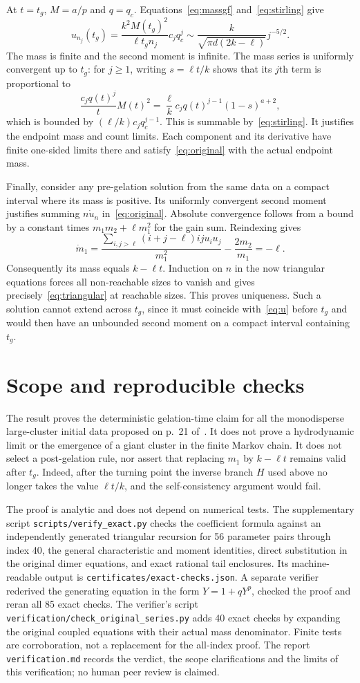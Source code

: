 \documentclass[11pt,a4paper]{report}
\begin{document}
At $t=t_g$, $M=a/p$ and $q=q_c$. Equations~\eqref{eq:massgf} and~\eqref{eq:stirling} give
\[
u_{n_j}(t_g)=\frac{k^2M(t_g)^2}{\ell t_g n_j}c_jq_c^j
\sim\frac{k}{\sqrt{\pi d(2k-\ell)}}j^{-5/2}.
\]
The mass is finite and the second moment is infinite. The mass series is uniformly convergent up to $t_g$: for $j\ge1$, writing $s=\ell t/k$ shows that its $j$th term is proportional to
\[
\frac{c_jq(t)^j}{t}M(t)^2
=\frac{\ell}{k}c_jq(t)^{j-1}(1-s)^{a+2},
\]
which is bounded by $(\ell/k)c_jq_c^{j-1}$. This is summable by~\eqref{eq:stirling}. It justifies the endpoint mass and count limits. Each component and its derivative have finite one-sided limits there and satisfy~\eqref{eq:original} with the actual endpoint mass.

Finally, consider any pre-gelation solution from the same data on a compact interval where its mass is positive. Its uniformly convergent second moment justifies summing $n\dot u_n$ in~\eqref{eq:original}. Absolute convergence follows from a bound by a constant times $m_1m_2+\ell m_1^2$ for the gain sum. Reindexing gives
\[
\dot m_1=\frac{\sum_{i,j>\ell}(i+j-\ell)ij u_i u_j}{m_1^2}
-\frac{2m_2}{m_1}=-\ell.
\]
Consequently its mass equals $k-\ell t$. Induction on $n$ in the now triangular equations forces all non-reachable sizes to vanish and gives precisely~\eqref{eq:triangular} at reachable sizes. This proves uniqueness. Such a solution cannot extend across $t_g$, since it must coincide with~\eqref{eq:u} before $t_g$ and would then have an unbounded second moment on a compact interval containing $t_g$.

\section{Scope and reproducible checks}
The result proves the deterministic gelation-time claim for all the monodisperse large-cluster initial data proposed on p.~21 of~\autocite{KR2026}. It does not prove a hydrodynamic limit or the emergence of a giant cluster in the finite Markov chain. It does not select a post-gelation rule, nor assert that replacing $m_1$ by $k-\ell t$ remains valid after $t_g$. Indeed, after the turning point the inverse branch $H$ used above no longer takes the value $\ell t/k$, and the self-consistency argument would fail.

The proof is analytic and does not depend on numerical tests. The supplementary script \texttt{scripts/verify\_exact.py} checks the coefficient formula against an independently generated triangular recursion for 56 parameter pairs through index 40, the general characteristic and moment identities, direct substitution in the original dimer equations, and exact rational tail enclosures. Its machine-readable output is \texttt{certificates/exact-checks.json}. A separate verifier rederived the generating equation in the form $Y=1+qY^p$, checked the proof and reran all 85 exact checks. The verifier's script \texttt{verification/check\_original\_series.py} adds 40 exact checks by expanding the original coupled equations with their actual mass denominator. Finite tests are corroboration, not a replacement for the all-index proof. The report \texttt{verification.md} records the verdict, the scope clarifications and the limits of this verification; no human peer review is claimed.

\paperreferences
\end{document}
